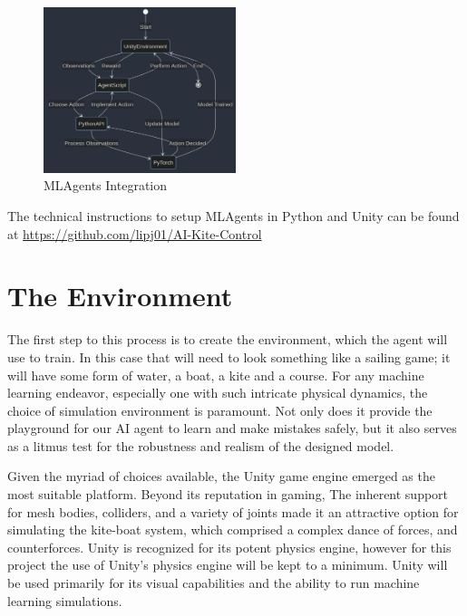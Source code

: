 


\begin{figure}[h]
    \centering
    \includegraphics[width=0.5\textwidth]{Images/unity_mlagents.png}
    \caption{MLAgents Integration}\label{MLAgents_Integration}
\end{figure}



The technical instructions to setup MLAgents in Python and Unity can be found at 
\url{https://github.com/lipj01/AI-Kite-Control}

\section{The Environment}

The first step to this process is to create the environment, which the agent will use to train. In this case that will need to look something like a sailing game; it will have some form of water, a boat, a kite and a course. 
For any machine learning endeavor, especially one with such intricate physical dynamics, the choice of simulation environment is paramount. Not only does it provide the playground for our AI agent to learn and make mistakes safely, but it also serves as a litmus test for the robustness and realism of the designed model.

Given the myriad of choices available, the Unity game engine emerged as the most suitable platform. Beyond its reputation in gaming, 
The inherent support for mesh bodies, colliders, and a variety of joints made it an attractive option for simulating the kite-boat system, which comprised a complex dance of forces, and counterforces.
Unity is recognized for its potent physics engine, however for this project the use of Unity's physics engine will be kept to a minimum. Unity will be used primarily for its visual capabilities and the ability to run machine learning simulations. 

